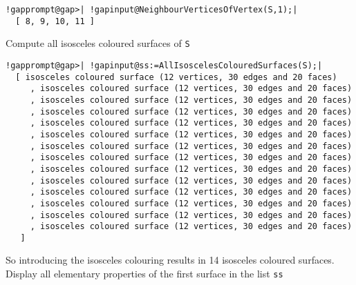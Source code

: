\documentclass[a4paper,11pt]{report}
\begin{document}
{{ 
\begin{Verbatim}[commandchars=!@|,fontsize=\small,frame=single,label=Example]
  !gapprompt@gap>| !gapinput@NeighbourVerticesOfVertex(S,1);|
  [ 8, 9, 10, 11 ]
\end{Verbatim}
 

 Compute all isosceles coloured surfaces of \texttt{S} 

 
\begin{Verbatim}[commandchars=!@|,fontsize=\small,frame=single,label=Example]
  !gapprompt@gap>| !gapinput@ss:=AllIsoscelesColouredSurfaces(S);|
  [ isosceles coloured surface (12 vertices, 30 edges and 20 faces)
     , isosceles coloured surface (12 vertices, 30 edges and 20 faces)
     , isosceles coloured surface (12 vertices, 30 edges and 20 faces)
     , isosceles coloured surface (12 vertices, 30 edges and 20 faces)
     , isosceles coloured surface (12 vertices, 30 edges and 20 faces)
     , isosceles coloured surface (12 vertices, 30 edges and 20 faces)
     , isosceles coloured surface (12 vertices, 30 edges and 20 faces)
     , isosceles coloured surface (12 vertices, 30 edges and 20 faces)
     , isosceles coloured surface (12 vertices, 30 edges and 20 faces)
     , isosceles coloured surface (12 vertices, 30 edges and 20 faces)
     , isosceles coloured surface (12 vertices, 30 edges and 20 faces)
     , isosceles coloured surface (12 vertices, 30 edges and 20 faces)
     , isosceles coloured surface (12 vertices, 30 edges and 20 faces)
     , isosceles coloured surface (12 vertices, 30 edges and 20 faces) 
   ]
\end{Verbatim}
 

 So introducing the isosceles colouring results in 14 isosceles coloured
surfaces. Display all elementary properties of the first surface in the list \texttt{ss} 

}}
\end{document}
